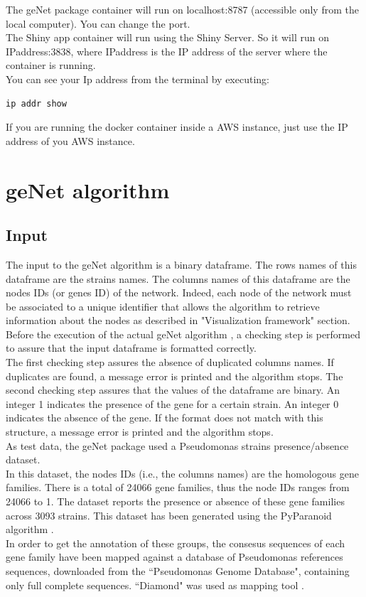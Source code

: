 \documentclass{article}
\begin{document}
The geNet package container will run on localhost:8787 (accessible only from the local computer). You can change the port.\\
The Shiny app container will run using the Shiny Server. So it will run on IPaddress:3838, where IPaddress is the IP address of the server where the container is running. \\
You can see your Ip address from the terminal by executing:
\begin{framed}
\begin{lstlisting}
ip addr show
\end{lstlisting}
\end{framed}
If you are running the docker container inside a AWS instance, just use the IP address of you AWS instance.

\newpage
\section{geNet algorithm}
\subsection{Input}
The input to the geNet algorithm is a binary dataframe.
The rows names of this dataframe are the strains names.
The columns names of this dataframe are the nodes IDs (or genes ID) of the network. Indeed, each node of the network must be associated to a unique identifier that allows the algorithm to retrieve information about the nodes as described in "Visualization framework" section.\\
Before the execution of the actual geNet algorithm , a checking step is performed to assure that the input dataframe is formatted correctly.\\
The first checking step assures the absence of duplicated columns names. If duplicates are found, a message error is printed and the algorithm stops.
The second checking step assures that the values of the dataframe are binary. An integer 1 indicates the presence of the gene for a certain strain. An integer 0 indicates the absence of the gene. If the format does not match with this structure, a message error is printed and the algorithm stops.\\
As test data, the geNet package used a Pseudomonas strains presence/absence dataset.\\ 
In this dataset, the nodes IDs (i.e., the columns names) are the homologous gene families. There is a total of 24066 gene families, thus the node IDs ranges from 24066 to 1. The dataset reports the presence or absence of these gene families across 3093 strains. This dataset has been generated using the PyParanoid algorithm \cite{Melnyk2019}. \\
In order to get the annotation of these groups, the consesus sequences of each gene family have been mapped against a database of Pseudomonas references sequences, downloaded from the ``Pseudomonas Genome Database", containing only full complete sequences. ``Diamond" was used as mapping tool \cite{Buchfink2015}.
\end{document}
